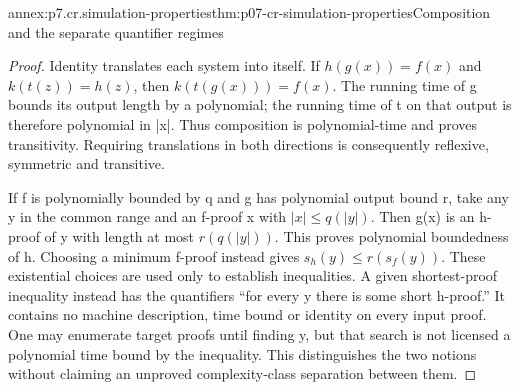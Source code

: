 \begin{annexitem}{annex:p7.cr.simulation-properties}{thm:p07-cr-simulation-properties}{Composition and the separate quantifier regimes}
\begin{proof}
Identity translates each system into itself. If
\(h(g(x))=f(x)\) and \(k(t(z))=h(z)\), then
\(k(t(g(x)))=f(x)\). The running time of g bounds its output
length by a polynomial; the running time of t on that output is
therefore polynomial in |x|. Thus composition is polynomial-time
and proves transitivity. Requiring translations in both directions
is consequently reflexive, symmetric and transitive.

If f is polynomially bounded by q and g has polynomial output
bound r, take any y in the common range and an f-proof x with
\(|x|\leq q(|y|)\). Then g(x) is an h-proof of y with length
at most \(r(q(|y|))\). This proves polynomial boundedness of h.
Choosing a minimum f-proof instead gives
\(s_h(y)\leq r(s_f(y))\). These existential choices are used
only to establish inequalities. A given shortest-proof inequality
instead has the quantifiers ``for every y there is some short
h-proof.'' It contains no machine description, time bound or
identity on every input proof. One may enumerate target proofs
until finding y, but that search is not licensed a polynomial
time bound by the inequality. This distinguishes the two notions
without claiming an unproved complexity-class separation between them.
\end{proof}
\end{annexitem}

